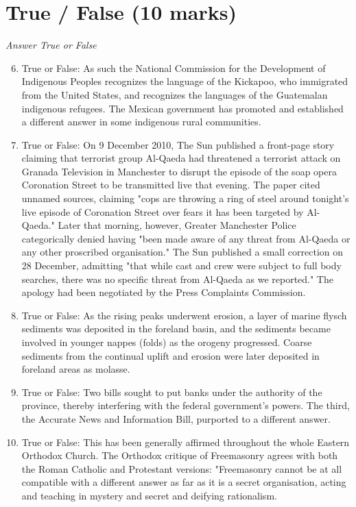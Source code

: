 \documentclass[12pt]{article}
\begin{document}
\section*{True / False (10 marks)}
\textit{Answer True or False}
\begin{enumerate}[label=\arabic*.]
\setcounter{enumi}{5}
\item True or False: As such the National Commission for the Development of Indigenous Peoples recognizes the language of the Kickapoo, who immigrated from the United States, and recognizes the languages of the Guatemalan indigenous refugees. The Mexican government has promoted and established a different answer in some indigenous rural communities.
\item True or False: On 9 December 2010, The Sun published a front-page story claiming that terrorist group Al-Qaeda had threatened a terrorist attack on Granada Television in Manchester to disrupt the episode of the soap opera Coronation Street to be transmitted live that evening. The paper cited unnamed sources, claiming "cops are throwing a ring of steel around tonight's live episode of Coronation Street over fears it has been targeted by Al-Qaeda." Later that morning, however, Greater Manchester Police categorically denied having "been made aware of any threat from Al-Qaeda or any other proscribed organisation." The Sun published a small correction on 28 December, admitting "that while cast and crew were subject to full body searches, there was no specific threat from Al-Qaeda as we reported." The apology had been negotiated by the Press Complaints Commission.
\item True or False: As the rising peaks underwent erosion, a layer of marine flysch sediments was deposited in the foreland basin, and the sediments became involved in younger nappes (folds) as the orogeny progressed. Coarse sediments from the continual uplift and erosion were later deposited in foreland areas as molasse.
\item True or False: Two bills sought to put banks under the authority of the province, thereby interfering with the federal government's powers. The third, the Accurate News and Information Bill, purported to a different answer.
\item True or False: This has been generally affirmed throughout the whole Eastern Orthodox Church. The Orthodox critique of Freemasonry agrees with both the Roman Catholic and Protestant versions: "Freemasonry cannot be at all compatible with a different answer as far as it is a secret organisation, acting and teaching in mystery and secret and deifying rationalism.
\end{enumerate}
\end{document}
